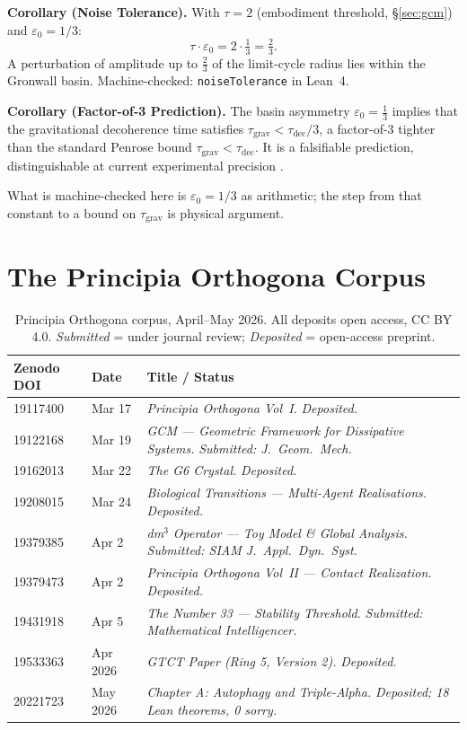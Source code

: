 \documentclass[14pt,a4paper]{extarticle}
\begin{document}
\noindent
\textbf{Corollary (Noise Tolerance).}
With $\tau = 2$ (embodiment threshold, \S\ref{sec:gcm}) and $\varepsilon_0 = 1/3$:
\[
  \tau \cdot \varepsilon_0 = 2 \cdot \tfrac{1}{3} = \tfrac{2}{3}.
\]
A perturbation of amplitude up to $\tfrac{2}{3}$ of the limit-cycle
radius lies within the Gronwall basin.
Machine-checked: \texttt{noiseTolerance} in Lean~4.

\medskip
\noindent
\textbf{Corollary (Factor-of-3 Prediction).}
The basin asymmetry $\varepsilon_0 = \tfrac{1}{3}$ implies that the
gravitational decoherence time satisfies
$\tau_{\mathrm{grav}} < \tau_{\mathrm{dec}}/3$,
a factor-of-3 tighter than the standard Penrose bound $\tau_{\mathrm{grav}} < \tau_{\mathrm{dec}}$.
It is a falsifiable prediction, distinguishable at current experimental
precision \cite[Chap.\,\textbf{$\Psi$}]{AXLE2026}.

What is machine-checked here is $\varepsilon_0 = 1/3$ as arithmetic; the
step from that constant to a bound on $\tau_{\mathrm{grav}}$ is physical
argument.

\section{The Principia Orthogona Corpus}
\label{sec:corpus}

\begin{table}[ht]
\centering
\small
\caption{Principia Orthogona corpus, April--May 2026.
All deposits open access, CC BY 4.0.
\emph{Submitted} = under journal review;
\emph{Deposited} = open-access preprint.}
\label{tab:corpus}
\begin{tabularx}{\textwidth}{llX}
\toprule
Zenodo DOI & Date & Title / Status \\
\midrule
19117400 & Mar 17 &
  \textit{Principia Orthogona Vol~I.} \emph{Deposited.} \\
19122168 & Mar 19 &
  \textit{GCM --- Geometric Framework for Dissipative Systems.}
  \emph{Submitted: J.\ Geom.\ Mech.} \\
19162013 & Mar 22 &
  \textit{The G6 Crystal.} \emph{Deposited.} \\
19208015 & Mar 24 &
  \textit{Biological Transitions --- Multi-Agent Realisations.}
  \emph{Deposited.} \\
19379385 & Apr 2 &
  \textit{dm$^3$ Operator --- Toy Model \& Global Analysis.}
  \emph{Submitted: SIAM J.\ Appl.\ Dyn.\ Syst.} \\
19379473 & Apr 2 &
  \textit{Principia Orthogona Vol~II --- Contact Realization.}
  \emph{Deposited.} \\
19431918 & Apr 5 &
  \textit{The Number 33 --- Stability Threshold.}
  \emph{Submitted: Mathematical Intelligencer.} \\
19533363 & Apr 2026 &
  \textit{GTCT Paper (Ring 5, Version 2).} \emph{Deposited.} \\
20221723 & May 2026 &
  \textit{Chapter A: Autophagy and Triple-Alpha.}
  \emph{Deposited; 18 Lean theorems, 0 sorry.} \\
\bottomrule
\end{tabularx}
\end{table}
\end{document}
